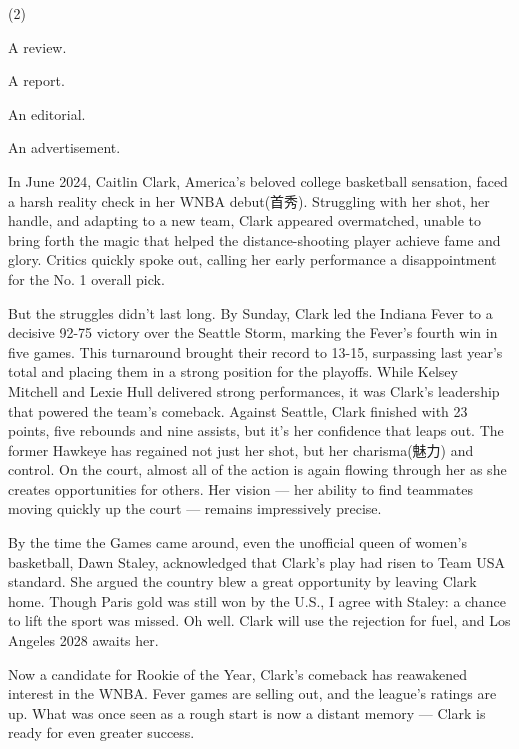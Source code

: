 \documentclass{英语试卷}
\begin{document}
\begin{choices}(2)
  \item A review.
  \item A report.
  \item An editorial.
  \item An advertisement.
\end{choices}
\par In June 2024, Caitlin Clark, America's beloved college basketball sensation, faced a harsh reality check in her WNBA debut(首秀). Struggling with her shot, her handle, and adapting to a new team, Clark appeared overmatched, unable to bring forth the magic that helped the distance-shooting player achieve fame and glory. Critics quickly spoke out, calling her early performance a disappointment for the No. 1 overall pick.\par
\par But the struggles didn't last long. By Sunday, Clark led the Indiana Fever to a decisive 92-75 victory over the Seattle Storm, marking the Fever's fourth win in five games. This turnaround brought their record to 13-15, surpassing last year's total and placing them in a strong position for the playoffs. While Kelsey Mitchell and Lexie Hull delivered strong performances, it was Clark's leadership that powered the team's comeback. Against Seattle, Clark finished with 23 points, five rebounds and nine assists, but it's her confidence that leaps out. The former Hawkeye has regained not just her shot, but her charisma(魅力) and control. On the court, almost all of the action is again flowing through her as she creates opportunities for others. Her vision — her ability to find teammates moving quickly up the court — remains impressively precise.\par
\par By the time the Games came around, even the unofficial queen of women's basketball, Dawn Staley, acknowledged that Clark's play had risen to Team USA standard. She argued the country blew a great opportunity by leaving Clark home. Though Paris gold was still won by the U.S., I agree with Staley: a chance to lift the sport was missed. Oh well. Clark will use the rejection for fuel, and Los Angeles 2028 awaits her.\par
\par Now a candidate for Rookie of the Year, Clark's comeback has reawakened interest in the WNBA. Fever games are selling out, and the league's ratings are up. What was once seen as a rough start is now a distant memory — Clark is ready for even greater success.\par
\end{document}
